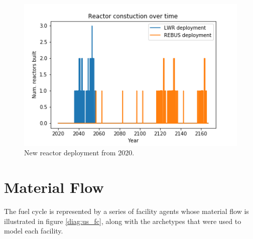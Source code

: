\begin{figure}[htbp!]
	\begin{center}
		\includegraphics[scale=0.6]{./images/us/us_dep.png}
	\end{center}
	\caption{New reactor deployment from 2020.}
	\label{fig:us_dep}
\end{figure}

\section{Material Flow}

The fuel cycle is represented by a series of facility agents whose material 
flow is illustrated in figure \ref{diag:us_fc}, along with
the \Cyclus archetypes that were used to model each facility.

